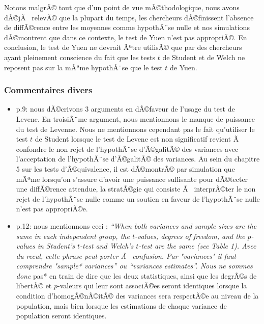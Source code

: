 \begin{appendix}
Notons malgrÃ© tout que d'un point de vue mÃ©thodologique, nous avons
dÃ©jÃ~ relevÃ© que la plupart du temps, les chercheurs dÃ©finissent
l'absence de diffÃ©rence entre les moyennes comme hypothÃ¨se nulle et
nos simulations dÃ©montrent que dans ce contexte, le test de Yuen n'est
pas appropriÃ©. En conclusion, le test de Yuen ne devrait Ãªtre utilisÃ©
que par des chercheurs ayant pleinement conscience du fait que les tests
\(t\) de Student et de Welch ne reposent pas sur la mÃªme hypothÃ¨se que
le test \(t\) de Yuen.

\hypertarget{commentaires-divers}{%
\subsubsection{Commentaires divers}\label{commentaires-divers}}

\begin{itemize}
\item
  p.9: nous dÃ©crivons 3 arguments en dÃ©faveur de l'usage du test de
  Levene. En troisiÃ¨me argument, nous mentionnons le manque de
  puissance du test de Levenne. Nous ne mentionnons cependant pas le
  fait qu'utiliser le test \(t\) de Student lorsque le test de Levene
  est non significatif revient Ã~ confondre le non rejet de l'hypothÃ¨se
  d'Ã©galitÃ© des variances avec l'acceptation de l'hypothÃ¨se
  d'Ã©galitÃ© des variances. Au sein du chapitre 5 sur les tests
  d'Ã©quivalence, il est dÃ©montrÃ© par simulation que mÃªme lorsqu'on
  s'assure d'avoir une puissance suffisante pour dÃ©tecter une
  diffÃ©rence attendue, la stratÃ©gie qui consiste Ã~ interprÃ©ter le
  non rejet de l'hypothÃ¨se nulle comme un soutien en faveur de
  l'hypothÃ¨se nulle n'est pas appropriÃ©e.
\item
  p.12: nous mentionnons ceci : \emph{``When both variances and sample
  sizes are the same in each independent group, the \(t\)-values,
  degrees of freedom, and the \(p\)-values in Student's \(t\)-test and
  Welch's \(t\)-test are the same (see Table 1)\emph{. Avec du recul,
  cette phrase peut porter Ã~ confusion. Par "variances" il faut
  comprendre "}sample* variances'' ou ``variances \emph{estimates}''.
  Nous ne sommes donc }pas* en train de dire que les deux statistiques,
  ainsi que les degrÃ©s de libertÃ© et \(p\)-valeurs qui leur sont
  associÃ©es seront identiques lorsque la condition d'homogÃ©nÃ©itÃ© des
  variances sera respectÃ©e au niveau de la population, mais bien
  lorsque les estimations de chaque variance de population seront
  identiques.
\end{itemize}


\end{appendix}
